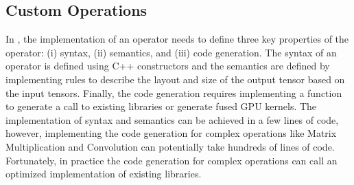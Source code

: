 \subsection{Custom Operations}
In \tool, the implementation of an operator needs to define three key properties of the operator: (i) syntax, (ii) semantics, and (iii) code generation.
The syntax of an operator is defined using C++ constructors and the semantics are defined by implementing rules to describe the layout and size of the output tensor based on the input tensors.
Finally, the code generation requires implementing a function to generate a call to existing libraries or generate fused GPU kernels.
The implementation of syntax and semantics can be achieved in a few lines of code, however, implementing the code generation for complex operations like Matrix Multiplication and Convolution can potentially take hundreds of lines of code.
Fortunately, in practice the code generation for complex operations can call an optimized implementation of existing libraries.


\iffalse
\subsection{Communication Collectives}
\TODO{may move to section implementation}
In addition to the \allreduce primitive mentioned above, communication libraries like NCCL~\cite{nccl}, 
support several collective communications based on the MPI standard~\cite{mpi}. 
The communication collectives in NCCL 
take an input buffer $b_i$ of size $N_i$ and writes to an output buffer $b_o$ of size $N_o$.
\emph{\allreduce} performs a reduction operation on $b_i$ and leaves identical copies of $b_o$ on all ranks.
\emph{\allgather} gathers all $N_i$ values of $b_i$ from all ranks to $b_o$, such that, $N_o = N_i \times |\WORLD|$.
\emph{\reducescatter} performs a reduction operation on $b_i$ and scatter the result among all ranks in $b_o$, such that, $N_o = N_i \div |\WORLD|$.
\emph{\reduce} takes a root rank $r$ and performs reduction on $b_i$ and only writes the result to $b_o$ of $r$.
\emph{\broadcast} takes a root rank $r$. It copies $N_i$ values of $b_i$ of rank $r$ and leaves identical copies in $b_o$ of all ranks.
\fi

